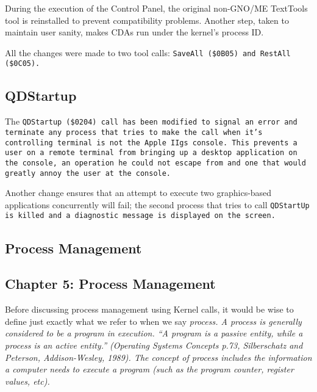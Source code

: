 \documentclass{report}
\begin{document}
During the execution of the Control Panel,
the original non-GNO/ME TextTools tool is reinstalled to prevent
compatibility problems. Another step, taken to maintain user
sanity, makes CDAs run under the kernel's process ID.

All the changes were made to two tool
calls: \tt SaveAll \rm (\$0B05) and \tt RestAll \rm (\$0C05).

\section{QDStartup}

The \tt QDStartup \rm (\$0204)
call has been modified to signal an error and
terminate any process that tries to make the call when it's
controlling terminal is not the Apple IIgs console. This prevents
a user on a remote terminal from bringing up a desktop
application on the console, an operation he could not escape from
and one that would greatly annoy the user at the console.

Another change ensures that an attempt to
execute two graphics-based applications concurrently will fail;
the second process that tries to call 
\tt QDStartUp \rm is killed and a diagnostic message is displayed
on the screen.

%
%

\begin{latexonly}
\chapter{Process Management}
\end{latexonly}
\begin{htmlonly}
\chapter{Chapter 5:  Process Management}
\end{htmlonly}

Before discussing process management using
Kernel calls, it would be wise to define just exactly what we
refer to when we say \it process\rm. A process is generally
considered to be a program in execution. ``A program is a
passive entity, while a process is an active entity.''
(Operating Systems Concepts p.73, Silberschatz and Peterson,
Addison-Wesley, 1989). The concept of process includes the
information a computer needs to execute a program (such as the
program counter, register values, etc).
\end{document}
